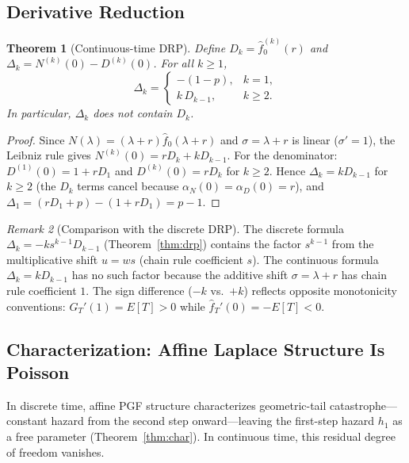\documentclass[11pt]{article}
\theoremstyle{plain}
\newtheorem{theorem}{Theorem}[section]
\theoremstyle{definition}
\theoremstyle{remark}
\newtheorem{remark}[theorem]{Remark}
\begin{document}
\subsection{Derivative Reduction}\label{sec:ct-drp}

\begin{theorem}[Continuous-time DRP]\label{thm:ct-drp}
Define $D_k = \hat{f}_0^{(k)}(r)$ and $\Delta_k = N^{(k)}(0) - D^{(k)}(0)$.  For all $k \geq 1$,
\begin{equation}\label{eq:ct-Delta}
  \Delta_k =
  \begin{cases}
    -(1-p), & k = 1, \\
    k\,D_{k-1}, & k \geq 2.
  \end{cases}
\end{equation}
In particular, $\Delta_k$ does not contain $D_k$.
\end{theorem}

\begin{proof}
Since $N(\lambda) = (\lambda + r)\hat{f}_0(\lambda + r)$ and $\sigma = \lambda + r$ is linear ($\sigma' = 1$), the Leibniz rule gives $N^{(k)}(0) = rD_k + kD_{k-1}$.  For the denominator: $D^{(1)}(0) = 1 + rD_1$ and $D^{(k)}(0) = rD_k$ for $k \geq 2$.  Hence $\Delta_k = kD_{k-1}$ for $k \geq 2$ (the $D_k$ terms cancel because $\alpha_N(0) = \alpha_D(0) = r$), and $\Delta_1 = (rD_1 + p) - (1 + rD_1) = p - 1$.
\end{proof}

\begin{remark}[Comparison with the discrete DRP]\label{rem:ct-drp-compare}
The discrete formula $\Delta_k = -ks^{k-1}D_{k-1}$ (Theorem~\ref{thm:drp}) contains the factor $s^{k-1}$ from the multiplicative shift $u = ws$ (chain rule coefficient $s$).  The continuous formula $\Delta_k = kD_{k-1}$ has no such factor because the additive shift $\sigma = \lambda + r$ has chain rule coefficient $1$.  The sign difference ($-k$ vs.\ $+k$) reflects opposite monotonicity conventions: $G_T'(1) = E[T] > 0$ while $\hat{f}_T'(0) = -E[T] < 0$.
\end{remark}



\subsection{Characterization: Affine Laplace Structure Is Poisson}\label{sec:ct-char}

In discrete time, affine PGF structure characterizes geometric-tail catastrophe---constant hazard from the second step onward---leaving the first-step hazard $h_1$ as a free parameter (Theorem~\ref{thm:char}).  In continuous time, this residual degree of freedom vanishes.
\end{document}
